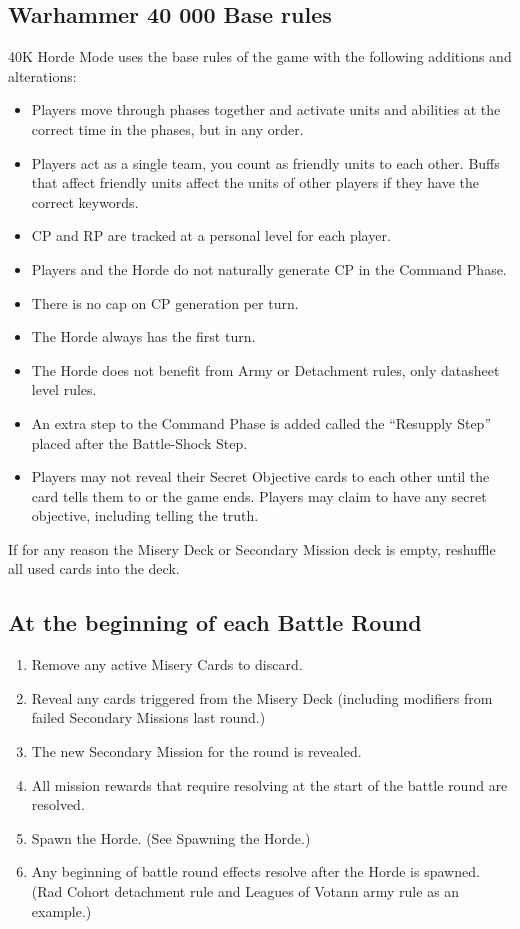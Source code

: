 \documentclass{HordeModeTarot}
\begin{document}
\subsection*{Warhammer 40 000 Base rules}

40K Horde Mode uses the base rules of the game with the following additions and alterations:

\begin{itemize}
\item{} Players move through phases together and activate units and abilities at the correct time in the phases, but in any order.
\item{} Players act as a single team, you count as friendly units to each other. Buffs that affect friendly units affect the units of other players if they have the correct keywords.
\item{} CP and RP are tracked at a personal level for each player.
\item{} Players and the Horde do not naturally generate CP in the Command Phase.
\item{} There is no cap on CP generation per turn.
\item{} The Horde always has the first turn.
\item{} The Horde does not benefit from Army or Detachment rules, only datasheet level rules.
\item{} An extra step to the Command Phase is added called the “Resupply Step” placed after the Battle-Shock Step.
\item{} Players may not reveal their Secret Objective cards to each other until the card tells them to or the game ends. Players may claim to have any secret objective, including telling the truth.
\end{itemize}

If for any reason the Misery Deck or Secondary Mission deck is empty, reshuffle all used cards into the deck.

\subsection*{At the beginning of each Battle Round}

\begin{enumerate}
\item{} Remove any active Misery Cards to discard.
\item{} Reveal any cards triggered from the Misery Deck (including modifiers from failed Secondary Missions last round.)
\item{} The new Secondary Mission for the round is revealed.
\item{} All mission rewards that require resolving at the start of the battle round are resolved.
\item{} Spawn the Horde. (See Spawning the Horde.)
\item{} Any beginning of battle round effects resolve after the Horde is spawned. (Rad Cohort detachment rule and Leagues of Votann army rule as an example.)
\end{enumerate}
\end{document}

